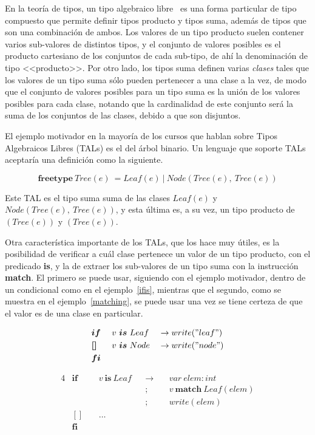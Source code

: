En la teoría de tipos, un tipo algebraico libre~\cite{ravelotal, foldoc,
lazywithclass} es una forma particular de tipo compuesto que permite definir
tipos producto y tipos suma, además de tipos que son una combinación de ambos.
Los valores de un tipo producto suelen contener varios sub-valores de distintos
tipos, y el conjunto de valores posibles es el producto cartesiano de los
conjuntos de cada sub-tipo, de ahí la denominación de tipo <<producto>>. Por
otro lado, los tipos suma definen varias \textit{clases} tales que  los valores
de un tipo suma sólo pueden pertenecer a una clase a la vez, de modo que el
conjunto de valores posibles para un tipo suma es la unión de los valores
posibles para cada clase, notando que la cardinalidad de este conjunto será la
suma de los conjuntos de las clases, debido a que son disjuntos.

El ejemplo motivador en la mayoría de los cursos que hablan sobre Tipos
Algebraicos Libres (TALs) es el del árbol binario. Un lenguaje que soporte TALs
aceptaría una definición como la siguiente.

$$ \textbf{freetype}\ Tree(e)\ = Leaf(e)\ |\ Node(Tree(e),\ Tree(e)) $$

Este TAL es el tipo suma suma de las clases
$Leaf(e)$ y $Node(Tree(e),\ Tree(e))$,
y esta última es, a su vez, un tipo producto de $(Tree(e))$ y $(Tree(e))$.

Otra característica importante de los TALs, que los hace muy útiles, es la
posibilidad de verificar a cuál clase pertenece un valor de un tipo producto,
con el predicado \textbf{is}, y la de extraer los sub-valores de un tipo suma
con la instrucción \textbf{match}. El primero se puede usar, siguiendo con el
ejemplo motivador, dentro de un condicional como en el ejemplo~\ref{ifis},
mientras que el segundo, como se muestra en el ejemplo~\ref{matching}, se puede
usar una vez se tiene certeza de que el valor es de una clase en particular.

\begin{alignat}{3}
&\boldsymbol{if}\ && v\ \boldsymbol{is}\ Leaf && \rightarrow write("leaf") \nonumber \\
&\boldsymbol{[]}\ && v\ \boldsymbol{is}\ Node && \rightarrow write("node") \label{ifis} \\
&\boldsymbol{fi} \nonumber
\end{alignat}

\begin{alignat}{4}
&\boldsymbol{if}\ && v\ \boldsymbol{is}\ Leaf && \rightarrow &&\ var\ elem : int                   \nonumber \\
&                 &&                          &&           ; &&\ v\ \boldsymbol{match}\ Leaf(elem) \nonumber \\
&                 &&                          &&           ; &&\ write (elem)                      \label{matching} \\
&\boldsymbol{[]}\ && \ldots                                                                        \nonumber \\
&\boldsymbol{fi}                                                                                   \nonumber
\end{alignat}

